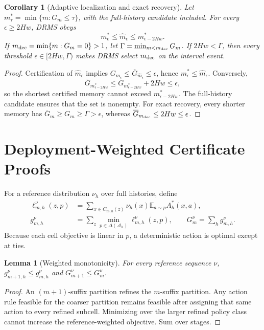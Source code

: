 \documentclass[letterpaper]{article} %
\newtheorem{lemma}{Lemma}
\newtheorem{corollary}{Corollary}
\newcommand{\E}{\mathbb E}
\newcommand{\cA}{\mathcal A}
\begin{document}
\begin{corollary}[Adaptive localization and exact recovery]
Let \(m_\tau^*=\min\{m:G_m\leq\tau\}\), with the full-history candidate
included.  For every \(\epsilon\geq2Hw\), DRMS obeys
\[
m_\epsilon^*\leq\widehat m_\epsilon
\leq m_{\epsilon-2Hw}^*.
\]
If \(m_{\rm dec}=\min\{m:G_m=0\}>1\), let
\(\Gamma=\min_{m<m_{\rm dec}}G_m\).  If \(2Hw<\Gamma\), then every
threshold \(\epsilon\in[2Hw,\Gamma)\) makes DRMS select
\(m_{\rm dec}\) on the interval event.
\end{corollary}
\begin{proof}
Certification of \(\widehat m_\epsilon\) implies
\(G_{\widehat m_\epsilon}\leq\overline G_{\widehat m_\epsilon}\leq
\epsilon\), hence \(m_\epsilon^*\leq\widehat m_\epsilon\).  Conversely,
\[
\overline G_{m_{\epsilon-2Hw}^*}
\leq G_{m_{\epsilon-2Hw}^*}+2Hw\leq\epsilon,
\]
so the shortest certified memory cannot exceed
\(m_{\epsilon-2Hw}^*\).  The full-history candidate ensures that the set is
nonempty.  For exact recovery, every shorter memory has
\(\overline G_m\geq G_m\geq\Gamma>\epsilon\), whereas
\(\overline G_{m_{\rm dec}}\leq2Hw\leq\epsilon\).
\end{proof}


\section{Deployment-Weighted Certificate Proofs}

For a reference distribution \(\nu_h\) over full histories, define
\[
\begin{aligned}
\ell_{m,h}^{\nu}(z,p)
&=\sum_{x\in C_{m,h}(z)}\nu_h(x)
  \E_{a\sim p}A_h^*(x,a),\\
g_{m,h}^{\nu}
&=\sum_z\min_{p\in\Delta(\cA_h)}\ell_{m,h}^{\nu}(z,p),
\qquad G_m^\nu=\sum_h g_{m,h}^\nu.
\end{aligned}
\]
Because each cell objective is linear in \(p\), a deterministic action is
optimal except at ties.

\begin{lemma}[Weighted monotonicity]
For every reference sequence \(\nu\),
\(g_{m+1,h}^{\nu}\leq g_{m,h}^{\nu}\) and
\(G_{m+1}^{\nu}\leq G_m^{\nu}\).
\end{lemma}
\begin{proof}
An \((m+1)\)-suffix partition refines the \(m\)-suffix partition.  Any action
rule feasible for the coarser partition remains feasible after assigning that
same action to every refined subcell.  Minimizing over the larger refined
policy class cannot increase the reference-weighted objective.  Sum over
stages.
\end{proof}
\end{document}
